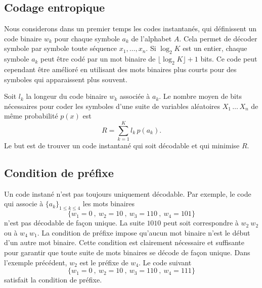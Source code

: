 \subsection{Codage entropique}
\label{entropy-code-sec}

Nous considerons dans un premier temps
les codes instantan\'es, qui d\'efinissent un code binaire
$w_k$ pour chaque symbole $a_k$ de l'alphabet $A$. Cela
permet de d\'ecoder symbole par symbole toute
s\'equence $x_1, \dots, x_n$.
Si $\log_2 K$ est un entier, chaque symbole
$a_k$ peut \^etre cod\'e par un mot binaire de
$\lfloor \log_2 K \rfloor + 1$ bits.
Ce code peut cependant \^etre am\'elior\'e
en utilisant des mots
binaires plus courts pour des symboles qui apparaissent plus
souvent.

Soit $l_k$ la longeur du code binaire
$w_k$ associ\'ee \`a $a_k$.
Le nombre moyen de bits n\'ecessaires pour coder les symboles
d'une suite de variables al\'eatoires $X_1 \, \dots\, X_n$ de
m\^eme probabilit\'e $p(x)$ est
\begin{equation}
\label{bit-rate}
R  = \sum_{k=1}^{K} l_k\, p(a_k) .
\end{equation}
Le but est de trouver un code instantan\'e qui soit
d\'ecodable et qui minimise $R$.\\

\subsection{Condition de pr\'efixe}
Un code instan\'e n'est pas toujours uniquement d\'ecodable.
Par exemple, le code qui associe \`a
$\{a_k\}_{1 \leq k \leq 4}$
les mots binaires
\[
\{w_1 = 0 ~,~w_2 = 10 ~,~w_3 = 110 ~,~w_4 = 101 \}
\]
n'est pas d\'ecodable de fa\c{c}on unique.
La suite $1010$ peut soit correspondre
\`a $w_2~w_2$ ou \`a $w_4~ w_1$.
La condition de pr\'efixe impose qu'aucun mot binaire n'est le
d\'ebut d'un autre mot binaire.
Cette condition est clairement n\'ecessaire et
suffisante pour garantir que
toute suite de mots binaires se d\'ecode de fa\c con unique.
Dans l'exemple pr\'ec\'edent,
$w_2$ est le pr\'efixe de $w_4$.
Le code suivant
\[
\{w_1 = 0 ~,~w_2 = 10 ~,~w_3 = 110 ~,~w_4 = 111 \}
\]
satisfait la condition de pr\'efixe.


